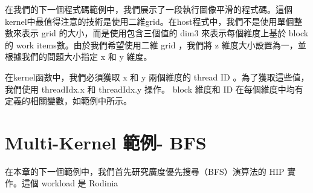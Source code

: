 在我們的下一個程式碼範例中，我們展示了一段執行圖像平滑的程式碼。這個kernel中最值得注意的技術是使用二維grid。在host程式中，我們不是使用單個整數來表示 grid 的大小，而是使用包含三個值的 dim3 來表示每個維度上基於 block 的 work items數。由於我們希望使用二維 grid ，我們將 z 維度大小設置為一，並根據我們的問題大小指定 x 和 y 維度。


在kernel函數中，我們必須獲取 x 和 y 兩個維度的 thread ID 。為了獲取這些值，我們使用 threadIdx.x 和 threadIdx.y 操作。 block 維度和 ID 在每個維度中均有定義的相關變數，如範例中所示。

\section{Multi-Kernel 範例- BFS} 

在本章的下一個範例中，我們首先研究廣度優先搜尋（BFS）演算法的 HIP 實作。這個 workload 是 Rodinia
